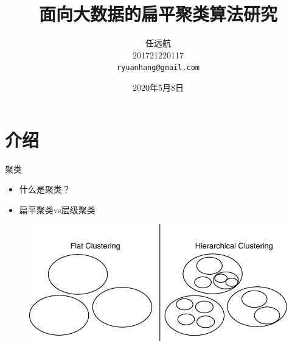 \documentclass[notheorems]{beamer}
\title{面向大数据的扁平聚类算法研究}
\author{任远航 \\ 201721220117 \\ \texttt{ryuanhang@gmail.com}}
\institute{信息与软件工程学院 \\ 电子科技大学}
\date{2020年5月8日}
\begin{document}
\begin{CJK*}{UTF8}{gbsn}
\begin{frame}
  \titlepage
\end{frame}


\section{介绍}

\begin{frame}{聚类}

\begin{itemize}
  \item 什么是聚类？
  \item 扁平聚类vs层级聚类
\end{itemize}

\begin{figure}
\centering
\includegraphics[scale=0.2]{clustering_types.png}
\end{figure}


\end{frame}
\end{CJK*}
\end{document}
